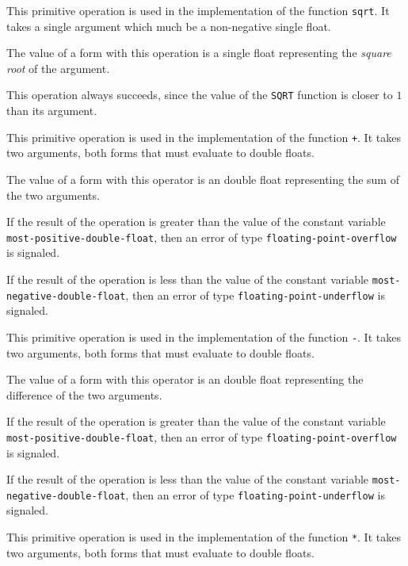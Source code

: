 {}

This primitive operation is used in the implementation of the
\commonlisp{} function \texttt{sqrt}.  It takes a single argument which
much be a non-negative single float.

The value of a form with this operation is a single float representing
the \emph{square root} of the argument.

This operation always succeeds, since the value of the \texttt{SQRT}
function is closer to $1$ than its argument.

 {}

This primitive operation is used in the implementation of the
\commonlisp{} function \texttt{+}.  It takes two arguments, both forms
that must evaluate to double floats.

The value of a form with this operator is an double float
representing the sum of the two arguments.

If the result of the operation is greater than the value of the
constant variable \texttt{most-positive-double-float}, then an error of
type \texttt{floating-point-overflow} is signaled.

If the result of the operation is less than the value of the
constant variable \texttt{most-negative-double-float}, then an error of
type \texttt{floating-point-underflow} is signaled.

 {}

This primitive operation is used in the implementation of the
\commonlisp{} function \texttt{-}.  It takes two arguments, both forms
that must evaluate to double floats.

The value of a form with this operator is an double float
representing the difference of the two arguments.

If the result of the operation is greater than the value of the
constant variable \texttt{most-positive-double-float}, then an error of
type \texttt{floating-point-overflow} is signaled.

If the result of the operation is less than the value of the
constant variable \texttt{most-negative-double-float}, then an error of
type \texttt{floating-point-underflow} is signaled.

 {}

This primitive operation is used in the implementation of the
\commonlisp{} function \texttt{*}.  It takes two arguments, both forms
that must evaluate to double floats.

